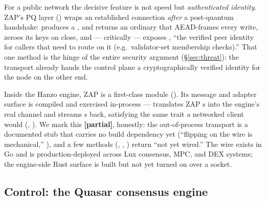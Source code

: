 \documentclass[11pt]{article}
\newcommand{\partialb}{\textcolor{kw}{\small\textbf{[partial]}}}
\begin{document}
For a public network the decisive feature is not speed but \emph{authenticated identity}. ZAP's
PQ layer () wraps an established connection \emph{after} a post-quantum
handshake:  produces a , and  returns an ordinary  that AEAD-frames every write, zeroes its keys on
close, and --- critically --- exposes , ``the verified peer identity for
callers that need to route on it (e.g.\ validator-set membership checks).'' That one method is
the hinge of the entire security argument (\S\ref{sec:threat}): the transport already hands the
control plane a cryptographically verified identity for the node on the other end.

Inside the Hanzo engine, ZAP is a first-class module (). Its
message and adapter surface is compiled and exercised in-process --- 
translates ZAP s into the engine's real  channel and streams
s back, satisfying the same  trait a networked client would
(, ). We mark this \partialb{}, honestly: the out-of-process
 transport is a documented stub that carries no  build dependency yet
(``flipping on the wire is mechanical,'' ), and a few methods
(, , ) return ``not yet wired.'' The wire exists
in Go and is production-deployed across Lux consensus, MPC, and DEX systems; the engine-side
Rust surface is built but not yet turned on over a socket.

\subsection{Control: the Quasar consensus engine}
\label{sec:quasar}
\end{document}
